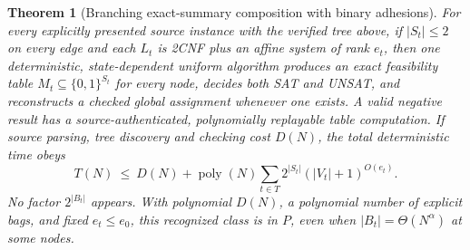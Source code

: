 \documentclass[11pt]{article}
\newtheorem{theorem}{Theorem}
\begin{document}
\begin{theorem}[Branching exact-summary composition with binary adhesions]
\label{thm:binary}
For every explicitly presented source instance with the verified tree above,
if $|S_t|\le2$ on every edge and each $L_t$ is 2CNF plus an affine system of
rank $e_t$, then one deterministic, state-dependent uniform algorithm produces
an exact feasibility table $M_t\subseteq\{0,1\}^{S_t}$ for every node,
decides both SAT and UNSAT, and reconstructs a checked global assignment
whenever one exists. A valid negative result has a source-authenticated,
polynomially replayable table computation. If source parsing, tree discovery
and checking cost $D(N)$, the total deterministic time obeys
\[
 \boxed{T(N)\ \le\ D(N)+\operatorname{poly}(N)
             \sum_{t\in T}2^{|S_t|}(|V_t|+1)^{O(e_t)}.}
\]
No factor $2^{|B_t|}$ appears. With polynomial $D(N)$, a polynomial number
of explicit bags, and fixed $e_t\le e_0$, this recognized class is in $P$,
\emph{even when $|B_t|=\Theta(N^\alpha)$} at some nodes.
\end{theorem}
\end{document}
